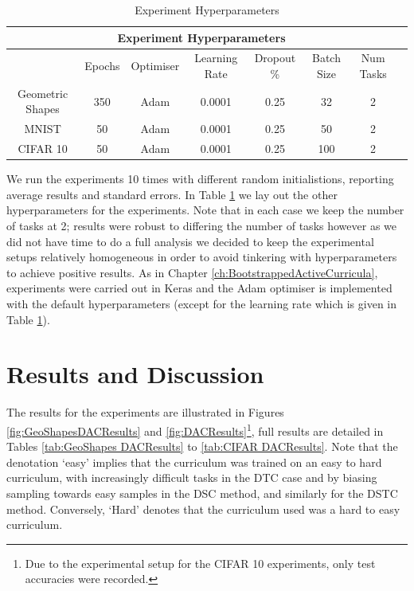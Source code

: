 \begin{table}[h!]
\caption{Experiment Hyperparameters} \label{tab:HyperParams2}
\hspace*{-2cm}
\begin{tabular}{|c||c|c|c|c|c|c|c|}
\hline
\multicolumn{7}{|c|}{Experiment Hyperparameters} \\
\hline
 &Epochs & Optimiser &Learning Rate & Dropout \% & Batch Size & Num Tasks\\
\hline
Geometric Shapes & 350 & Adam & 0.0001 & 0.25 & 32 & 2  \\
\hline
MNIST & 50 & Adam & 0.0001 & 0.25 & 50 & 2  \\
\hline
CIFAR 10 & 50 & Adam & 0.0001 & 0.25 & 100 & 2  \\
\hline
\end{tabular}
\end{table}
We run the experiments 10 times with different random initialistions, reporting average results and standard errors. In Table \ref{tab:HyperParams2} we lay out the other hyperparameters for the experiments. Note that in each case we keep the number of tasks at 2; results were robust to differing the number of tasks however as we did not have time to do a full analysis we decided to keep the experimental setups relatively homogeneous in order to avoid tinkering with hyperparameters to achieve positive results. As in Chapter \ref{ch:BootstrappedActiveCurricula}, experiments were carried out in Keras \cite{chollet2015keras} and the Adam optimiser is implemented with the default hyperparameters (except for the learning rate which is given in Table \ref{tab:HyperParams2}). 

\section{Results and Discussion}
The results for  the experiments are  illustrated in Figures \ref{fig:GeoShapesDACResults} and \ref{fig:DACResults}\footnote{Due to the experimental setup for the CIFAR 10 experiments, only test accuracies were recorded.}, full results are detailed in Tables \ref{tab:GeoShapes DACResults} to \ref{tab:CIFAR DACResults}. Note that the denotation `easy' implies that the curriculum was trained on an easy to hard curriculum, with increasingly difficult tasks in the DTC case and by biasing sampling towards easy samples in the DSC method, and similarly for the DSTC method. Conversely, `Hard' denotes that the curriculum used was a hard to easy curriculum.

